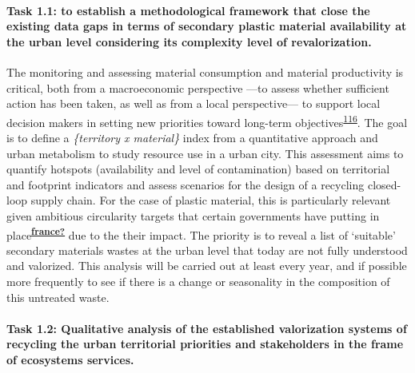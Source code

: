 \documentclass[
  12pt,
  a4paperpaper,
  onecolumn]{article}
\let\oldparagraph\paragraph
\renewcommand{\paragraph}[1]{\oldparagraph{#1}\mbox{}}
\let\paragraph\oldparagraph
\begin{document}
\hypertarget{task-1.1-to-establish-a-methodological-framework-that-close-the-existing-data-gaps-in-terms-of-secondary-plastic-material-availability-at-the-urban-level-considering-its-complexity-level-of-revalorization.}{%
\paragraph{Task 1.1: to establish a methodological framework that close
the existing data gaps in terms of secondary plastic material
availability at the urban level considering its complexity level of
revalorization.}\label{task-1.1-to-establish-a-methodological-framework-that-close-the-existing-data-gaps-in-terms-of-secondary-plastic-material-availability-at-the-urban-level-considering-its-complexity-level-of-revalorization.}}

The monitoring and assessing material consumption and material
productivity is critical, both from a macroeconomic perspective ---to
assess whether sufficient action has been taken, as well as from a local
perspective--- to support local decision makers in setting new
priorities toward long-term
objectives\textsuperscript{\protect\hyperlink{ref-Bianchi2020}{116}}.
The goal is to define a \emph{\{territory x material\}} index from a
quantitative approach and urban metabolism to study resource use in a
urban city. This assessment aims to quantify hotspots (availability and
level of contamination) based on territorial and footprint indicators
and assess scenarios for the design of a recycling closed-loop supply
chain. For the case of plastic material, this is particularly relevant
given ambitious circularity targets that certain governments have
putting in
place\textsuperscript{\protect\hyperlink{ref-france}{\textbf{france?}}}
due to the their impact. The priority is to reveal a list of `suitable'
secondary materials wastes at the urban level that today are not fully
understood and valorized. This analysis will be carried out at least
every year, and if possible more frequently to see if there is a change
or seasonality in the composition of this untreated waste.

\hypertarget{task-1.2-qualitative-analysis-of-the-established-valorization-systems-of-recycling-the-urban-territorial-priorities-and-stakeholders-in-the-frame-of-ecosystems-services.}{%
\paragraph{Task 1.2: Qualitative analysis of the established
valorization systems of recycling the urban territorial priorities and
stakeholders in the frame of ecosystems
services.}\label{task-1.2-qualitative-analysis-of-the-established-valorization-systems-of-recycling-the-urban-territorial-priorities-and-stakeholders-in-the-frame-of-ecosystems-services.}}
\end{document}
